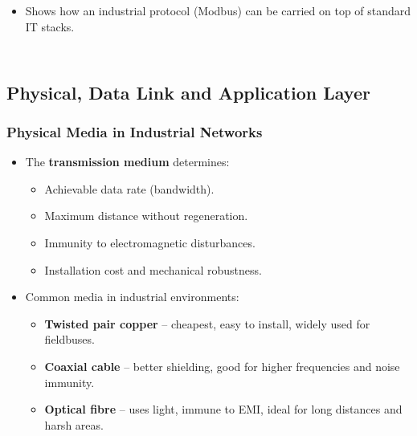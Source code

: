 \begin{frame}
\begin{columns}[T]
\begin{itemize}
\begin{itemize}
					\item \textbf{Preamble, MAC addresses, LLC/FCS} – physical/data link.
					\item \textbf{IP header} – network layer (routing).
					\item \textbf{TCP header} – transport layer (ports, reliability).
					\item \textbf{Application payload} – protocols such as HTTP, FTP, Modbus/TCP.
				\end{itemize}
				\item Shows how an industrial protocol (Modbus) can be carried on top of standard IT stacks.
			\end{itemize}
	\end{columns}
\end{frame}

\subsection{Physical, Data Link and Application Layer}

\begin{frame}
	\frametitle{Physical Media in Industrial Networks}
	\small
	\begin{itemize}
		\item The \textbf{transmission medium} determines:
		\begin{itemize}
			\item Achievable data rate (bandwidth).
			\item Maximum distance without regeneration.
			\item Immunity to electromagnetic disturbances.
			\item Installation cost and mechanical robustness.
		\end{itemize}
		\item Common media in industrial environments:
		\begin{itemize}
			\item \textbf{Twisted pair copper} – cheapest, easy to install, widely used for fieldbuses.
			\item \textbf{Coaxial cable} – better shielding, good for higher frequencies and noise immunity.
			\item \textbf{Optical fibre} – uses light, immune to EMI, ideal for long distances and harsh areas.
		\end{itemize}
	\end{itemize}
\end{frame}

